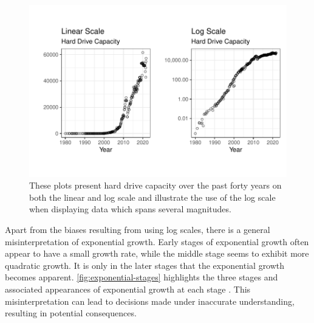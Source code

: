 \documentclass[12pt]{article}
\begin{document}
\begin{figure}[tbp]

{\centering \includegraphics[width=1\linewidth,]{logarithmic-lineups-revisions_files/figure-latex/log-scales-1} 

}

\caption{These plots present hard drive capacity over the past forty years on both the linear and log scale and illustrate the use of the log scale when displaying data which spans several magnitudes.}\label{fig:log-scales}
\end{figure}

Apart from the biases resulting from using log scales, there is a
general misinterpretation of exponential growth. Early stages of
exponential growth often appear to have a small growth rate, while the
middle stage seems to exhibit more quadratic growth. It is only in the
later stages that the exponential growth becomes apparent.
\cref{fig:exponential-stages} highlights the three stages and associated
appearances of exponential growth at each stage
\citep{vonbergmann_2021}. This misinterpretation can lead to decisions
made under inaccurate understanding, resulting in potential
consequences.
\end{document}
